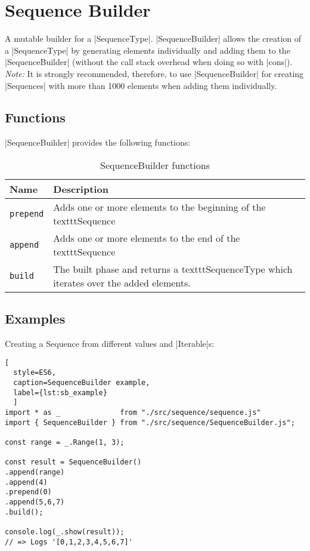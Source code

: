 \section{Sequence Builder}
\label{sec:Sequence Builder}
A mutable builder for a |SequenceType|.
\newline
|SequenceBuilder| allows the creation of a |SequenceType| by generating elements individually 
and adding them to the |SequenceBuilder| (without the call stack overhead when doing so
with |cons|).
\newline
\textit{Note:} It is strongly recommended, therefore, to use |SequenceBuilder|
for creating |Sequences| with more than 1000 elements when adding them
individually.

\subsection{Functions}
\label{sub:sb_Functions}

|SequenceBuilder| provides the following functions:

\begin{table}[H]
  \centering
  \begin{tabularx}{\textwidth}{| l | X |} \hline
    \textbf{Name}    & \textbf{Description} \\ \hline
    \texttt{prepend} & Adds one or more elements to the beginning of the texttt{Sequence}\\ \hline 
    \texttt{append}  & Adds one or more elements to the end of the texttt{Sequence} \\ \hline 
    \texttt{build}   & The built phase and returns a texttt{SequenceType} which iterates over the added elements. \\ \hline 
   \end{tabularx}
  \caption{SequenceBuilder functions}
  \label{tab:sb_functions}
\end{table}

\subsection{Examples}
\label{sub:sb_Examples}
Creating a Sequence from different values and |Iterable|s:

\begin{lstlisting}[
  style=ES6, 
  caption=SequenceBuilder example,
  label={lst:sb_example}
  ]
import * as _              from "./src/sequence/sequence.js"
import { SequenceBuilder } from "./src/sequence/SequenceBuilder.js";

const range = _.Range(1, 3);

const result = SequenceBuilder()
.append(range)
.append(4)
.prepend(0)
.append(5,6,7)
.build();

console.log(_.show(result));
// => Logs '[0,1,2,3,4,5,6,7]'
\end{lstlisting}
